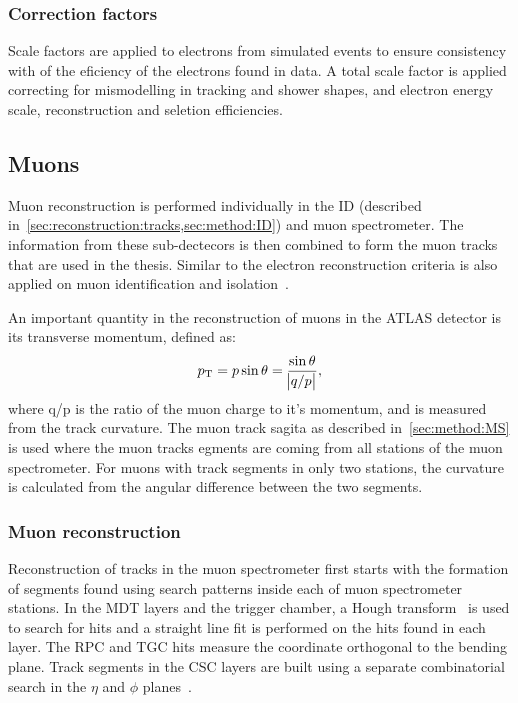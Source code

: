 \subsubsection{Correction factors}

Scale factors are applied to electrons from simulated events to ensure consistency with of the eficiency of the electrons found in data. A total scale factor is applied correcting for mismodelling in tracking and shower shapes, and electron energy scale, reconstruction and seletion efficiencies.

\subsection{Muons}\label{sec:reconstruction:muons}
Muon reconstruction is performed individually in the ID (described in~\cref{sec:reconstruction:tracks,sec:method:ID}) and muon spectrometer. The information from these sub-dectecors is then combined to form the muon tracks that are used in the thesis.  Similar to the electron reconstruction criteria is also applied on muon identification and isolation~\cite{Aad:2016jkr}. 

An important quantity in the reconstruction of muons in the ATLAS detector is its transverse momentum, defined as: 
\begin{equation}
    p_{\text{T}} = p\sin\theta = \frac{\sin\theta}{\abs{q/p}},
\end{equation}
where q/p is the ratio of the muon charge to it's momentum, and is measured from the track curvature. The muon track sagita as described in~\cref{sec:method:MS} is used where the muon tracks egments are coming from all stations of the muon spectrometer. For muons with track segments in only two stations, the curvature is calculated from the angular difference between the two segments. 

\subsubsection{Muon reconstruction}
Reconstruction of tracks in the muon spectrometer first starts with the formation of segments found using search patterns inside each of muon spectrometer stations. In the MDT layers and the trigger chamber, a Hough transform~\cite{HoughTransform} is used to search for hits and a straight line fit is performed on the hits found in each layer. The RPC and TGC hits measure the coordinate orthogonal to the bending plane. Track segments in the CSC layers are built using a separate combinatorial search in the $\eta$ and $\phi$ planes~\cite{Aad:2016jkr}. 

